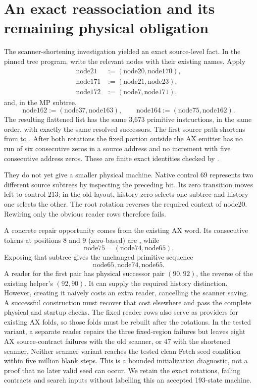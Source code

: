\documentclass[11pt]{article}
\newcommand{\code}[1]{\texttt{\detokenize{#1}}}
\begin{document}
\section{An exact reassociation and its remaining physical obligation}\label{sec:rotation}
The scanner-shortening investigation yielded an exact source-level fact. In the pinned tree program, write the relevant nodes with their existing names. Apply
\begin{align*}
 \mathrm{node21}&:=(\mathrm{node20},\mathrm{node170}),\\
 \mathrm{node171}&:=(\mathrm{node21},\mathrm{node23}),\\
 \mathrm{node172}&:=(\mathrm{node7},\mathrm{node171}),
\end{align*}
and, in the MP subtree,
\[
 \mathrm{node162}:=(\mathrm{node37},\mathrm{node163}),\qquad
 \mathrm{node164}:=(\mathrm{node75},\mathrm{node162}).
\]
The resulting flattened list has the same 3,673 primitive instructions, in the same order, with exactly the same resolved successors. The first source path shortens from \code{000000} to \code{00000}. After both rotations the fixed portion outside the AX emitter has no run of six consecutive zeros in a source address and no increment with five consecutive address zeros. These are finite exact identities checked by .

They do not yet give a smaller physical machine. Native control 69 represents two different source subtrees by inspecting the preceding bit. Its zero transition moves left to control 213; in the old layout, history zero selects one subtree and history one selects the other. The root rotation reverses the required context of node20. Rewiring only the obvious reader rows therefore fails.

A concrete repair opportunity comes from the existing AX word. Its consecutive tokens at positions 8 and 9 (zero-based) are \code{node65,node75}, while
\[
 \mathrm{node75}=(\mathrm{node74},\mathrm{node65}).
\]
Exposing that subtree gives the unchanged primitive sequence
\[
 \mathrm{node65},\mathrm{node74},\mathrm{node65}.
\]
A reader for the first pair has physical successor pair $(90,92)$, the reverse of the existing helper's $(92,90)$. It can supply the required history distinction. However, creating it naively costs an extra reader, cancelling the scanner saving. A successful construction must recover that cost elsewhere and pass the complete physical and startup checks. The fixed reader rows also serve as providers for existing AX folds, so those folds must be rebuilt after the rotations. In the tested variant, a separate reader repairs the three fixed-region failures but leaves eight AX source-contract failures with the old scanner, or 47 with the shortened scanner. Neither scanner variant reaches the tested clean Fetch seed condition within five million blank steps. This is a bounded initialization diagnostic, not a proof that no later valid seed can occur. We retain the exact rotations, failing contracts and search inputs without labelling this an accepted 193-state machine.
\end{document}
